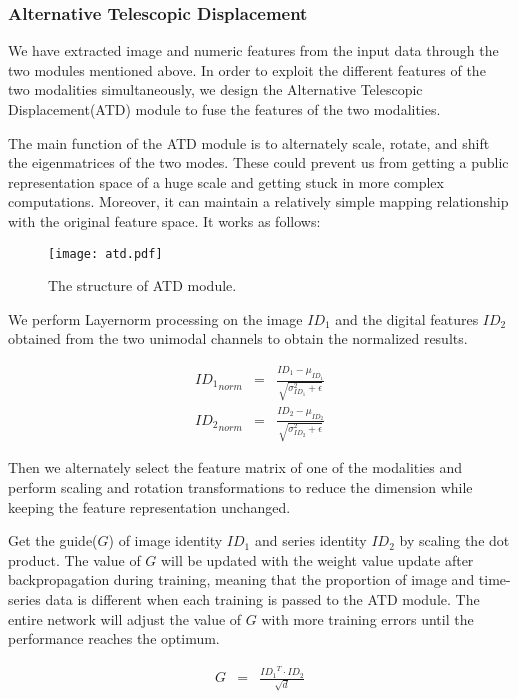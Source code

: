 \documentclass{ecai}
\begin{document}
\subsubsection{Alternative Telescopic Displacement}
We have extracted image and numeric features from the input data through the two modules mentioned above. In order to exploit the different features of the two modalities simultaneously, we design the Alternative Telescopic Displacement(ATD) module to fuse the features of the two modalities.

The main function of the ATD module is to alternately scale, rotate, and shift the eigenmatrices of the two modes. These could prevent us from getting a public representation space of a huge scale and getting stuck in more complex computations. Moreover, it can maintain a relatively simple mapping relationship with the original feature space. It works as follows:
\begin{figure}
    \centering
    \texttt{[image: atd.pdf]}
    \caption{The structure of ATD module. }
    \label{fig:network}
\end{figure}

We perform Layernorm processing on the image $ID_1$ and the digital features $ID_2$ obtained from the two unimodal channels to obtain the normalized results. 

\begin{eqnarray}
{ID_1}_{norm} & = & \frac{{ID_1} - \mu_{ID_1}}{\sqrt{\sigma_{ID_1}^2 + \epsilon}}\\
{ID_2}_{norm} & = & \frac{{ID_2} - \mu_{ID_2}}{\sqrt{\sigma_{ID_2}^2 + \epsilon}}
\end{eqnarray}

Then we alternately select the feature matrix of one of the modalities and perform scaling and rotation transformations to reduce the dimension while keeping the feature representation unchanged.

Get the guide($ G $) of image identity $ ID_1 $ and series identity $ ID_2 $ by scaling the dot product. The value of $ G $ will be updated with the weight value update after backpropagation during training, meaning that the proportion of image and time-series data is different when each training is passed to the ATD module. The entire network will adjust the value of $ G $ with more training errors until the performance reaches the optimum.

\begin{eqnarray}
G & = & \frac{{ID_1}^T\cdot ID_2}{\sqrt{d}}
\end{eqnarray}
\end{document}
